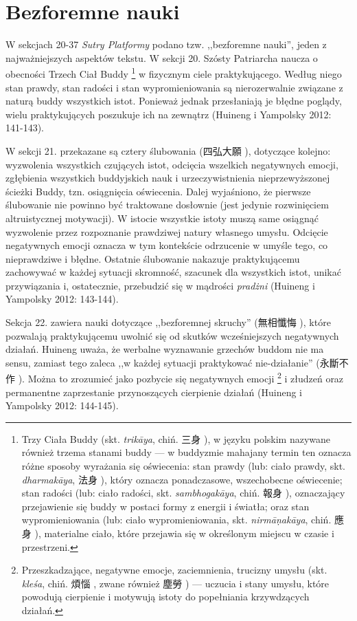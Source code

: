 \section{Bezforemne nauki}
W sekcjach 20-37 \textit{Sutry Platformy} podano tzw. ,,bezforemne nauki'', jeden z najważniejszych aspektów tekstu. W sekcji 20. Szósty Patriarcha naucza o obecności Trzech Ciał Buddy%
\footnote{Trzy Ciała Buddy (skt. \textit{trikāya}, chiń. 三身 ), w języku polskim nazywane również trzema stanami buddy --- w buddyzmie mahajany termin ten oznacza różne sposoby wyrażania się oświecenia: stan prawdy (lub: ciało prawdy, skt. \textit{dharmakāya}, 法身 ), który oznacza ponadczasowe, wszechobecne oświecenie; stan radości (lub: ciało radości, skt. \textit{sambhogakāya}, chiń. 報身 ), oznaczający przejawienie się buddy w postaci formy z energii i światła; oraz stan wypromieniowania (lub: ciało wypromieniowania, skt. \textit{nirmā\d{n}akāya}, chiń. 應身 ), materialne ciało, które przejawia się w określonym miejscu w czasie i przestrzeni.}
w fizycznym ciele praktykującego.
Według niego stan prawdy, stan radości i stan wypromieniowania są nierozerwalnie związane z naturą buddy wszystkich istot.
Ponieważ jednak przesłaniają je błędne poglądy, wielu praktykujących poszukuje ich na zewnątrz
(Huineng i Yampolsky 2012: 141-143).

W sekcji 21. przekazane są cztery ślubowania (四弘大願 ), dotyczące kolejno: wyzwolenia wszystkich czujących istot, odcięcia wszelkich negatywnych emocji, zgłębienia wszystkich buddyjskich nauk i urzeczywistnienia nieprzewyższonej ścieżki Buddy, tzn. osiągnięcia oświecenia.
Dalej wyjaśniono, że pierwsze ślubowanie nie powinno być traktowane dosłownie (jest jedynie rozwinięciem altruistycznej motywacji).
W istocie wszystkie istoty muszą same osiągnąć wyzwolenie przez rozpoznanie prawdziwej natury własnego umysłu.
Odcięcie negatywnych emocji oznacza w tym kontekście odrzucenie w umyśle tego, co nieprawdziwe i błędne.
Ostatnie ślubowanie nakazuje praktykującemu zachowywać w każdej sytuacji skromność, szacunek dla wszystkich istot, unikać przywiązania i, ostatecznie, przebudzić się w mądrości \textit{pradżni}
(Huineng i Yampolsky 2012: 143-144).

Sekcja 22. zawiera nauki dotyczące ,,bezforemnej skruchy'' (無相懺悔 ), które pozwalają praktykującemu uwolnić się od skutków wcześniejszych negatywnych działań. %
Huineng uważa, że werbalne wyznawanie grzechów buddom nie ma sensu, zamiast tego zaleca ,,w każdej sytuacji praktykować nie-działanie'' (永斷不作 ). Można to zrozumieć jako pozbycie się negatywnych emocji%
\footnote{Przeszkadzające, negatywne emocje, zaciemnienia, trucizny umysłu (skt. \textit{kleśa}, chiń. 煩惱 , zwane również 塵勞 ) --- uczucia i stany umysłu, które powodują cierpienie i motywują istoty do popełniania krzywdzących działań.}
i złudzeń oraz permanentne zaprzestanie przynoszących cierpienie działań
(Huineng i Yampolsky 2012: 144-145).

